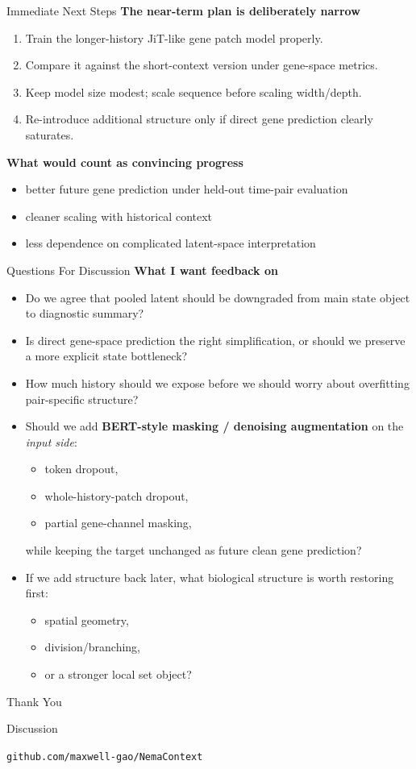 \documentclass[aspectratio=169,11pt]{beamer}
\begin{document}
\begin{frame}{Immediate Next Steps}
\textbf{The near-term plan is deliberately narrow}
\begin{enumerate}
    \item Train the longer-history JiT-like gene patch model properly.
    \item Compare it against the short-context version under gene-space metrics.
    \item Keep model size modest; scale sequence before scaling width/depth.
    \item Re-introduce additional structure only if direct gene prediction clearly saturates.
\end{enumerate}

\vspace{0.7em}
\textbf{What would count as convincing progress}
\begin{itemize}
    \item better future gene prediction under held-out time-pair evaluation
    \item cleaner scaling with historical context
    \item less dependence on complicated latent-space interpretation
\end{itemize}
\end{frame}

\begin{frame}{Questions For Discussion}
\textbf{What I want feedback on}
\begin{itemize}
    \item Do we agree that pooled latent should be downgraded from main state object to diagnostic summary?
    \item Is direct gene-space prediction the right simplification, or should we preserve a more explicit state bottleneck?
    \item How much history should we expose before we should worry about overfitting pair-specific structure?
    \item Should we add \textbf{BERT-style masking / denoising augmentation} on the \emph{input side}:
    \begin{itemize}
        \item token dropout,
        \item whole-history-patch dropout,
        \item partial gene-channel masking,
    \end{itemize}
    while keeping the target unchanged as future clean gene prediction?
    \item If we add structure back later, what biological structure is worth restoring first:
    \begin{itemize}
        \item spatial geometry,
        \item division/branching,
        \item or a stronger local set object?
    \end{itemize}
\end{itemize}
\end{frame}

\begin{frame}
\centering
\Huge Thank You

\vspace{1.5em}
\Large Discussion

\vspace{1.5em}
\normalsize
\texttt{github.com/maxwell-gao/NemaContext}
\end{frame}
\end{document}
